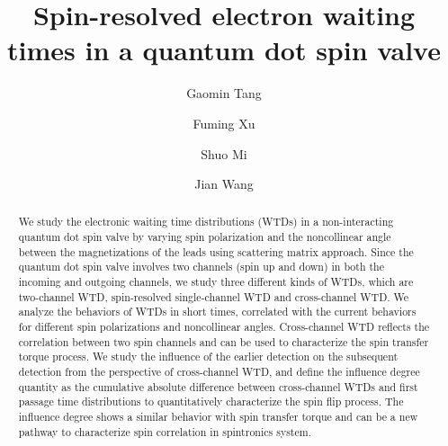 \documentclass[aps,prb,twocolumn,footinbib,showpacs,superscriptaddress,preprintnumbers,amsmath,amssymb]{revtex4-1}
\begin{document}
\title{Spin-resolved electron waiting times in a quantum dot spin valve}

\author{Gaomin Tang}
\author{Fuming Xu}
\author{Shuo Mi}
\author{Jian Wang}


\begin{abstract}
We study the electronic waiting time distributions (WTDs) in a non-interacting quantum dot spin valve by varying spin polarization and the noncollinear angle between the magnetizations of the leads using scattering matrix approach. Since the quantum dot spin valve involves two channels (spin up and down) in both the incoming and outgoing channels, we study three different kinds of WTDs, which are two-channel WTD, spin-resolved single-channel WTD and cross-channel WTD. We analyze the behaviors of WTDs in short times, correlated with the current behaviors for different spin polarizations and noncollinear angles. 	
	Cross-channel WTD reflects the correlation between two spin channels and can be used to characterize the spin transfer torque process. We study the influence of the earlier detection on the subsequent detection from the perspective of cross-channel WTD, and define the influence degree quantity as the cumulative absolute difference between cross-channel WTDs and first passage time distributions to quantitatively characterize the spin flip process.
	The influence degree shows a similar behavior with spin transfer torque and can be a new pathway to characterize spin correlation in spintronics system. 
\end{abstract}


\end{document}
